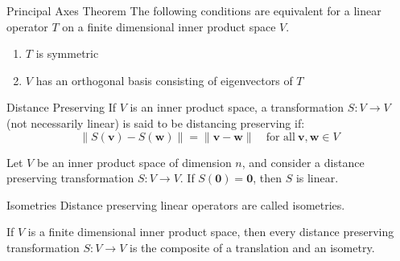 \documentclass[12pt]{article}
\begin{document}
\begin{theorem}{Principal Axes Theorem}{}
    The following conditions are equivalent for a linear operator $ T $ on a finite dimensional inner product space $ V $.
    \begin{enumerate}[label=(\roman*)]
        \item $ T $ is symmetric
        \item $ V $ has an orthogonal basis consisting of eigenvectors of $ T $
    \end{enumerate}
\end{theorem}

\begin{definition}{Distance Preserving}{}
    If $ V $ is an inner product space, a transformation $ S : V \to V $ (not necessarily linear) is said to be distancing preserving if:
    \[ \lVert S \left( \mathbf{v} \right) - S \left( \mathbf{w} \right) \rVert = \lVert \mathbf{v} - \mathbf{w} \rVert \quad \text{for all} \ \mathbf{v}, \mathbf{w} \in V \]
\end{definition}

\begin{lemma}{}{}
    Let $ V $ be an inner product space of dimension $ n $, and consider a distance preserving transformation $ S : V \to V $. If $ S \left( \mathbf{0} \right) = \mathbf{0} $, then $ S $ is linear.
\end{lemma}

\begin{definition}{Isometries}{}
    Distance preserving linear operators are called isometries.
\end{definition}

\begin{theorem}{}{}
    If $ V $ is a finite dimensional inner product space, then every distance preserving transformation $ S : V \to V $ is the composite of a translation and an isometry.
\end{theorem}
\end{document}
